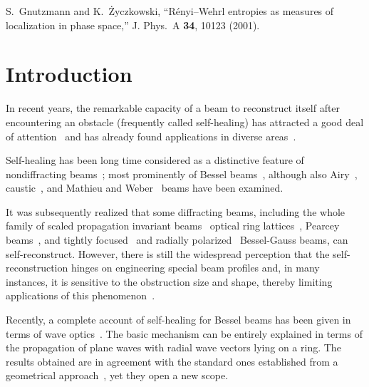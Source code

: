 \documentclass[10pt]{article}
\begin{document}
\begin{thebibliography}{99}
S.~Gnutzmann and K.~\.{Z}yczkowski, 
``R\'enyi--Wehrl entropies as measures of localization in phase space,''
J. Phys.~A \textbf{34}, 10123 (2001).



\end{thebibliography}


\section{Introduction}

In recent years, the remarkable capacity of a beam to reconstruct
itself after encountering an obstacle (frequently called self-healing)
has attracted a good deal of attention~\cite{Bouchal:1998aa,
  Vasnetsov:2000aa,Garces:2004aa} and has already found applications
in diverse areas~\cite{Arlt:2001aa,Garces:2002aa,Fahrbach:2010aa,
  Fahrbach:2012aa,McLaren:2014aa}.

Self-healing has been long time considered as a distinctive feature of
nondiffracting beams~\cite{Durmin:1987aa}; most prominently of Bessel
beams~\cite{Bouchal:2002aa,Tao:2004aa,Fischer:2006aa,Chu:2012aa},
although also Airy~\cite{Broky:2008aa},
caustic~\cite{Anguiano:2007aa}, and Mathieu and
Weber~\cite{Zhang:2012aa} beams have been examined.

It was subsequently realized that some diffracting beams, including
the whole family of scaled propagation invariant
beams~\cite{Arrizon:2015aa} optical ring
lattices~\cite{Vainty:2011aa}, Pearcey beams~\cite{Ring:2012aa}, and
tightly focused~\cite{Vyas:2011aa} and radially
polarized~\cite{Wu:2014aa} Bessel-Gauss beams, can
self-reconstruct. However, there is still the widespread perception
that the self-reconstruction hinges on engineering special beam
profiles and, in many instances, it is sensitive to the obstruction
size and shape, thereby limiting applications of this
phenomenon~\cite{Wang:2016aa}.

Recently, a complete account of self-healing for Bessel beams has been
given in terms of wave optics~\cite{Aiello:2014aa}. The basic
mechanism can be entirely explained in terms of the propagation of
plane waves with radial wave vectors lying on a ring. The results
obtained are in agreement with the standard ones established from a
geometrical approach~\cite{McGloin:2005aa,Litvin:2009aa}, yet they
open a new scope.
\end{document}
